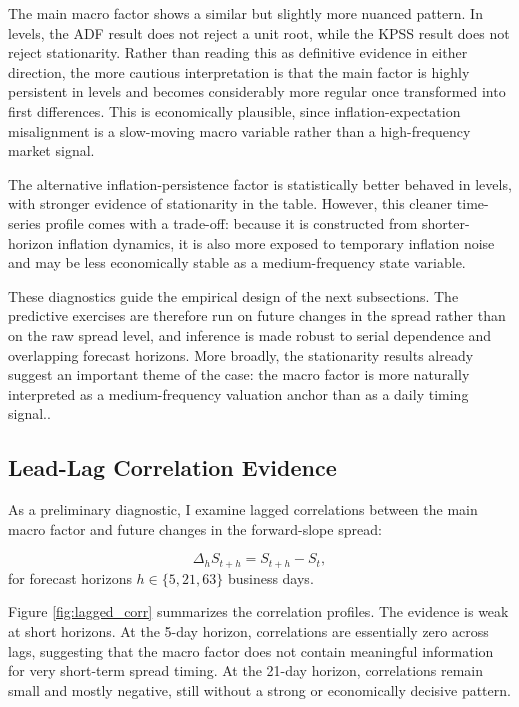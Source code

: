 \documentclass[11pt]{article}
\begin{document}
The main macro factor shows a similar but slightly more nuanced pattern. In levels, the ADF result does not reject a unit root, while the KPSS result does not reject stationarity. Rather than reading this as definitive evidence in either direction, the more cautious interpretation is that the main factor is highly persistent in levels and becomes considerably more regular once transformed into first differences. This is economically plausible, since inflation-expectation misalignment is a slow-moving macro variable rather than a high-frequency market signal.

The alternative inflation-persistence factor is statistically better behaved in levels, with stronger evidence of stationarity in the table. However, this cleaner time-series profile comes with a trade-off: because it is constructed from shorter-horizon inflation dynamics, it is also more exposed to temporary inflation noise and may be less economically stable as a medium-frequency state variable.

These diagnostics guide the empirical design of the next subsections. The predictive exercises are therefore run on future changes in the spread rather than on the raw spread level, and inference is made robust to serial dependence and overlapping forecast horizons. More broadly, the stationarity results already suggest an important theme of the case: the macro factor is more naturally interpreted as a medium-frequency valuation anchor than as a daily timing signal..
	
	\subsection{Lead-Lag Correlation Evidence}
	\label{subsec:lead_lag_evidence}
	
	As a preliminary diagnostic, I examine lagged correlations between the main macro factor and future changes in the forward-slope spread:
	
	\[
	\Delta_h S_{t+h} = S_{t+h} - S_t,
	\]
	for forecast horizons \(h \in \{5, 21, 63\}\) business days.
	
	Figure \ref{fig:lagged_corr} summarizes the correlation profiles. The evidence is weak at short horizons. At the 5-day horizon, correlations are essentially zero across lags, suggesting that the macro factor does not contain meaningful information for very short-term spread timing. At the 21-day horizon, correlations remain small and mostly negative, still without a strong or economically decisive pattern.
	
\end{document}

